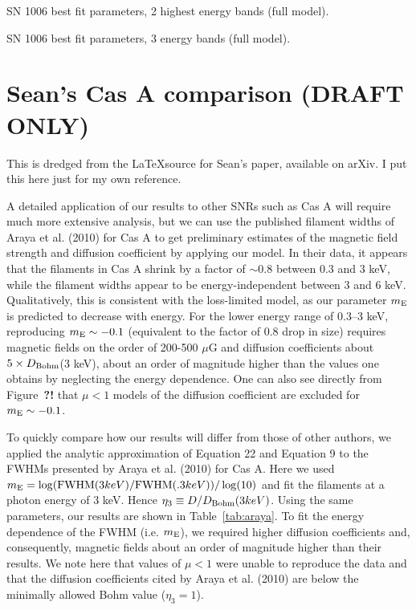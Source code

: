 \documentclass[iop, apj, numberedappendix, twocolappendix]{emulateapj}
\begin{document}
\begin{table*}[ht]
    \tiny
    \centering
    \caption{SN 1006 best fit parameters, 2 highest energy bands (full model).
    \label{tab:sn1006-2band}}
    
\end{table*}

\begin{table*}[ht]
    \tiny
    \centering
    \caption{SN 1006 best fit parameters, 3 energy bands (full model).
    \label{tab:sn1006-3band}}
    
\end{table*}


\section{Sean's Cas A comparison (DRAFT ONLY)}

This is dredged from the \LaTeX source for Sean's paper, available on arXiv.
I put this here just for my own reference.

A detailed application of our results to other SNRs such as Cas A will
require much more extensive analysis, but we can use the published
filament widths of Araya et al. (2010) for Cas A to get preliminary
estimates of the magnetic field strength and diffusion coefficient by
applying our model. In their data, it appears that the filaments in
Cas A shrink by a factor of $\sim 0.8$ between 0.3 and 3 keV, while the
filament widths appear to be energy-independent between 3 and 6 keV.
Qualitatively, this is consistent with the loss-limited model, as our
parameter $m_{\rm E}$ is predicted to decrease with energy.  For the
lower energy range of 0.3--3 keV, reproducing $m_{\rm E}\sim -0.1$
(equivalent to the factor of 0.8 drop in size) requires magnetic
fields on the order of 200-500 $\mu$G and diffusion coefficients about
$5 \times D_{\rm Bohm}$(3 keV), about an order of magnitude higher
than the values one obtains by neglecting the energy dependence. One
can also see directly from Figure~\textbf{?!} that $\mu < 1$ models
of the diffusion coefficient are excluded for $m_{\rm E}\sim -0.1$.

To quickly compare how our results will differ from those of other authors, we
applied the analytic approximation of Equation 22 and Equation 9 to the FWHMs
presented by Araya et al. (2010) for Cas A. Here we used $m_{\rm E} = \log(
{\rm FWHM}(3keV)/{\rm FWHM}(.3keV))/\log(10)$ and fit the filaments at a photon
energy of 3 keV.  Hence $\eta_3 \equiv D/D_{\rm Bohm}(3 keV)$. Using the same
parameters, our results are shown in Table~\ref{tab:araya}. To fit the energy
dependence of the FWHM (i.e. $m_{\rm E}$), we required higher diffusion
coefficients and, consequently, magnetic fields about an order of magnitude
higher than their results. We note here that values of $\mu<1$ were unable to
reproduce the data and that the diffusion coefficients cited by Araya et al.
(2010) are below the minimally allowed Bohm value ($\eta_3 = 1$).
\end{document}
